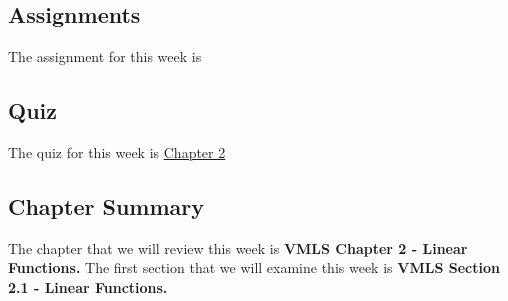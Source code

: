 \subsection{Assignments}

The assignment for this week is   

\subsection{Quiz}

The quiz for this week is \href{https://applied.cs.colorado.edu/mod/quiz/view.php?id=50687}{Chapter 2} \textbullet {}  

\subsection{Chapter Summary}

The chapter that we will review this week is \textbf{VMLS Chapter 2 - Linear Functions.} The first section that we will examine this week is \textbf{VMLS Section 2.1 - Linear Functions.}

